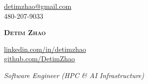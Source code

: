 \begin{center}
  \begin{minipage}[c]{0.33\textwidth}
    \raggedright
    \href{mailto:detimzhao@gmail.com}{{detimzhao@gmail.com}} \\
    \small 480-207-9033
  \end{minipage}%
  \begin{minipage}[c]{0.34\textwidth}
    \centering
    \textbf{\Huge \scshape Detim Zhao}
  \end{minipage}%
  \begin{minipage}[c]{0.33\textwidth}
    \raggedleft
    \href{https://www.linkedin.com/in/detimzhao/}{{linkedin.com/in/detimzhao}} \\
    \href{https://github.com/DetimZhao}{{github.com/DetimZhao}}
  \end{minipage}

  \vspace{\gapHeadingInternal}

  {\large\itshape Software Engineer (HPC \& AI Infrastructure)}
\end{center}\vspace{\gapAfterHeading}